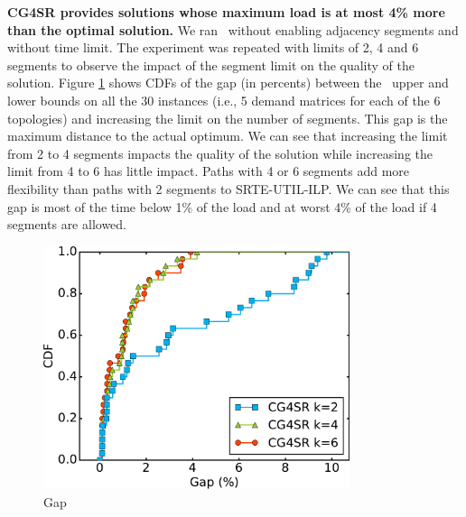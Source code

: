 \textbf{CG4SR provides solutions whose maximum load is at most 4\% more than the optimal solution.} 
We ran \name~without enabling adjacency segments and without time limit.
The experiment was repeated with limits of 2, 4 and 6 segments
to observe the impact of the segment limit on the quality of the solution.
Figure \ref{fig:optimum:gap} shows CDFs of the gap (in percents)
between the \name~upper and lower bounds
on all the 30 instances (i.e., 5 demand matrices for each of the 6 topologies)
and increasing the limit on the number of segments.
This gap is the maximum distance to the actual optimum.
We can see that increasing the limit from 2 to 4 segments impacts
the quality of the solution while increasing the limit from 4 to 6 has little impact.
Paths with 4 or 6 segments add more flexibility than paths with 2 segments
to SRTE-UTIL-ILP.
We can see that this gap is most of the time below 1\% of the load and at worst 4\% of the load
if 4 segments are allowed.


\begin{figure}
\begin{center}
\includegraphics[width=0.8\textwidth]{images/solver_gap_optim_seg_cmp.2016RocketFuelUCL.cdfs.pdf}
\end{center}
\caption{Gap}
\label{fig:optimum:gap}
\end{figure}


